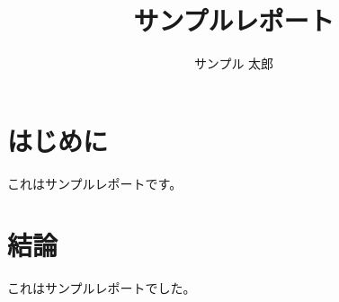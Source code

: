 \documentclass[a4paper,10pt]{jarticle}
\title{サンプルレポート}
\author{サンプル 太郎}
\begin{document}
\maketitle
\pagestyle{empty}

\section{はじめに}

これはサンプルレポートです\cite{sanner1999python}。

\section{結論}

これはサンプルレポートでした。



\end{document}
